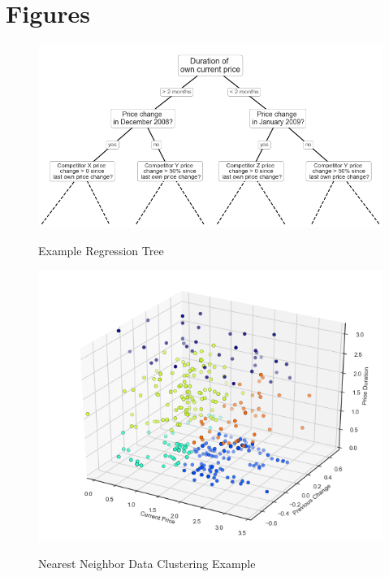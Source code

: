 \documentclass[11pt]{article}
\begin{document}
\section{Figures}
\clearpage
\begin{figure}[t]
    \centering
     \caption{Example Regression Tree}
    \includegraphics[scale=.65]{rf_tree.png}
    \label{Figure 1}
\end{figure}
\begin{figure}[b]
    \centering
        \caption{Nearest Neighbor Data Clustering Example}
    \includegraphics[scale=.75]{kmeans_cluster2.png}
    \label{Figure 2}
\end{figure}
\end{document}
